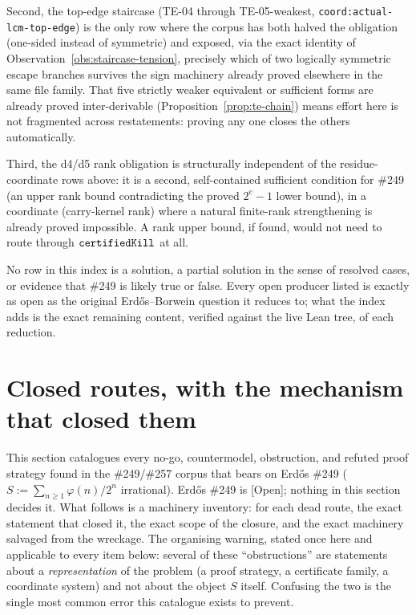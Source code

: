 \documentclass[11pt]{article}
\theoremstyle{breakplain}
\theoremstyle{breakdefinition}
\theoremstyle{breakdefinition}
\let\origmathtt\mathtt
\renewcommand{\mathtt}[1]{\ifmmode\origmathtt{#1}\else\texttt{#1}\fi}%
\newcommand{\ev}[1]{{\small\textsf{[#1]}}\xspace}
\newcommand{\coord}[1]{\texorpdfstring{{\small\nolinkurl{coord:#1}}}{coord:#1}\xspace}
\begin{document}
Second, the top-edge staircase (TE-04 through TE-05-weakest, \coord{actual-lcm-top-edge}) is the
only row where the corpus has both halved the obligation (one-sided instead of symmetric) and
exposed, via the exact identity of Observation~\ref{obs:staircase-tension}, precisely which of two
logically symmetric escape branches survives the sign machinery already proved elsewhere in the
same file family. That five strictly weaker equivalent or sufficient forms are already proved
inter-derivable (Proposition~\ref{prop:te-chain}) means effort here is not fragmented across
restatements: proving any one closes the others automatically.

Third, the d4/d5 rank obligation is structurally independent of the residue-coordinate rows above:
it is a second, self-contained sufficient condition for \#249 (an upper rank bound contradicting
the proved $2^e{-}1$ lower bound), in a coordinate (carry-kernel rank) where a natural finite-rank
strengthening is already proved impossible. A rank upper bound, if found, would not need to route
through $\mathtt{certifiedKill}$ at all.

No row in this index is a solution, a partial solution in the sense of resolved cases, or evidence
that \#249 is likely true or false. Every open producer listed is exactly as open as the original
Erd\H{o}s--Borwein question it reduces to; what the index adds is the exact remaining content,
verified against the live Lean tree, of each reduction.
\section{Closed routes, with the mechanism that closed them}

This section catalogues every no-go, countermodel, obstruction, and refuted
proof strategy found in the \#249/\#257 corpus that bears on Erd\H{o}s \#249
(\(S := \sum_{n\ge1}\varphi(n)/2^n\) irrational). Erd\H{o}s \#249 is
\ev{Open}; nothing in this section decides it. What follows is a machinery
inventory: for each dead route, the exact statement that closed it, the exact
scope of the closure, and the exact machinery salvaged from the wreckage.
The organising warning, stated once here and applicable to every item below:
several of these ``obstructions'' are statements about a
\emph{representation} of the problem (a proof strategy, a certificate
family, a coordinate system) and not about the object \(S\) itself. Confusing
the two is the single most common error this catalogue exists to prevent.
\end{document}
